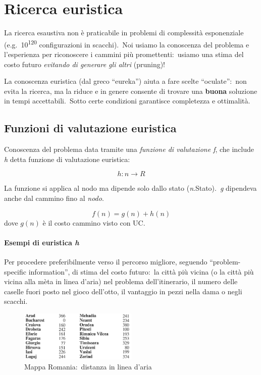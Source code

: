 \chapter{Ricerca euristica}

La ricerca esaustiva non è praticabile in problemi di complessità esponenziale (e.g.\ 10\textsuperscript{120} configurazioni in scacchi).\
Noi usiamo la conoscenza del problema e l'esperienza per riconoscere i cammini più promettenti:\ usiamo una stima del costo futuro \textit{evitando di generare gli altri} (pruning)!

La conoscenza euristica (dal greco ``eureka'') aiuta a fare scelte ``oculate'':\ non evita la ricerca, ma la riduce e in genere consente di trovare una \textbf{buona} soluzione in tempi accettabili.\
Sotto certe condizioni garantisce completezza e ottimalità.

\section{Funzioni di valutazione euristica}

Conoscenza del problema data tramite una \textit{funzione di valutazione f}, che include \textit{h} detta funzione di valutazione euristica:

\[h : n \rightarrow R\]

\noindent La funzione si applica al nodo ma dipende solo dallo stato (\textit{n}.Stato).\
\textit{g} dipendeva anche dal cammino fino al \textit{nodo}.

\[f(n) = g(n) + h(n)\]
dove $g(n)$ è il costo cammino visto con UC.

\subsubsection{Esempi di euristica \textit{h}}

Per procedere preferibilmente verso il percorso migliore, seguendo ``problem-specific information'', di stima del costo futuro:\ la città più vicina (o la città più vicina alla mèta in linea d'aria) nel problema dell'itinerario, il numero delle caselle fuori posto nel gioco dell'otto, il vantaggio in pezzi nella dama o negli scacchi.

\begin{figure}[H]
	\centering
	\includegraphics[width=0.5\textwidth]{immagini/Romania_euristica.png}
	\caption*{Mappa Romania:\ distanza in linea d'aria}
\end{figure}

